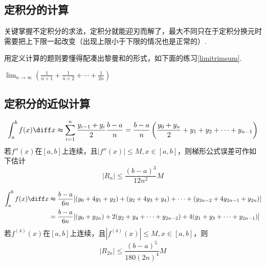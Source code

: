 \subsection{定积分的计算}
关键掌握不定积分的求法，定积分就能迎刃而解了，最大不同只在于定积分换元时需要把上下限一起改变（出现上限小于下限的情况也是正常的）.
\par 用定义计算的题则要懂得配凑出黎曼和的形式，如下面的练习\ref{limitrimsum}.
\begin{exercise}
\label{limitrimsum}
$\displaystyle\lim_{n\to\infty}\left(\frac{1}{n+1}+\frac{1}{n+2}+\cdots+\frac{1}{2n}\right)$
\end{exercise}

\subsection{定积分的近似计算}
\begin{definition}[定积分梯形公式]
\[\int_a^bf(x)\diff x\thickapprox\sum_{i=1}^n\frac{y_{i-1}+y_i}{2}\frac{b-a}{n}=\frac{b-a}{n}\left(\frac{y_0+y_n}{2}+y_1+y_2+\cdots+y_{n-1}\right)\]
若$f''(x)$在$[a,b]$上连续，且$|f''(x)|\leq M,x\in[a,b]$，则梯形公式误差可作如下估计
\[|R_n|\leq\frac{(b-a)^3}{12n^2}M\]
\end{definition}
\begin{definition}
\[\begin{aligned}
\int_a^bf(x)\diff x &\thickapprox\frac{b-a}{6n}[(y_0+4y_1+y_2)+(y_2+4y_3+y_4)+\cdots+(y_{2n-2}+4y_{2n-1}+y_{2n})]\\
&=\frac{b-a}{6n}[(y_0+y_{2n})+2(y_2+y_4+\cdots+y_{2n-2})+4(y_1+y_3+\cdots+y_{2n-1})]\end{aligned}\]
若$f^{(4)}(x)$在$[a,b]$上连续，且$|f^{(4)}(x)|\leq M,x\in[a,b]$，则
\[|R_{2n}|\leq\frac{(b-a)^5}{180(2n)^4}M\]
\end{definition}

